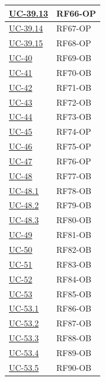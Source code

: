 ﻿\documentclass[a4paper,12pt]{article}
\begin{document}
\begin{description}[style=multiline, leftmargin=4cm, font=\bfseries]
\begin{enumerate}[leftmargin=*, nosep]
{\begin{longtable}{|p{4cm}|p{4cm}|}
    \hline
    \hyperref[fig:uc-39.13]{UC-39.13} & RF66-OP \\
    \hline
    \hyperref[fig:uc-39.14]{UC-39.14} & RF67-OP \\
    \hline
    \hyperref[fig:uc-39.15]{UC-39.15} & RF68-OP \\
    \hline
    \hyperref[fig:uc-40]{UC-40} & RF69-OB \\
    \hline
    \hyperref[fig:uc-41]{UC-41} & RF70-OB \\
    \hline
    \hyperref[fig:uc-42]{UC-42} & RF71-OB \\
    \hline
    \hyperref[fig:uc-43]{UC-43} & RF72-OB \\
    \hline
    \hyperref[fig:uc-44]{UC-44} & RF73-OB \\
    \hline
    \hyperref[fig:uc-45]{UC-45} & RF74-OP \\
    \hline
    \hyperref[fig:uc-46]{UC-46} & RF75-OP \\
    \hline
    \hyperref[fig:uc-47]{UC-47} & RF76-OP \\
    \hline
    \hyperref[fig:uc-48]{UC-48} & RF77-OB \\
    \hline
    \hyperref[fig:uc-48.1]{UC-48.1} & RF78-OB \\
    \hline
    \hyperref[fig:uc-48.2]{UC-48.2} & RF79-OB \\
    \hline
    \hyperref[fig:uc-48.3]{UC-48.3} & RF80-OB \\
    \hline
    \hyperref[fig:uc-49]{UC-49} & RF81-OB \\
    \hline
    \hyperref[fig:uc-50]{UC-50} & RF82-OB \\
    \hline
    \hyperref[fig:uc-51]{UC-51} & RF83-OB \\
    \hline
    \hyperref[fig:uc-52]{UC-52} & RF84-OB \\
    \hline
    \hyperref[fig:uc-53]{UC-53} & RF85-OB \\
    \hline
    \hyperref[fig:uc-53.1]{UC-53.1} & RF86-OB \\
    \hline
    \hyperref[fig:uc-53.2]{UC-53.2} & RF87-OB \\
    \hline
    \hyperref[fig:uc-53.3]{UC-53.3} & RF88-OB \\
    \hline
    \hyperref[fig:uc-53.4]{UC-53.4} & RF89-OB \\
    \hline
    \hyperref[fig:uc-53.5]{UC-53.5} & RF90-OB \\
    \hline


\end{longtable}}
\end{enumerate}
\end{description}
\end{document}
